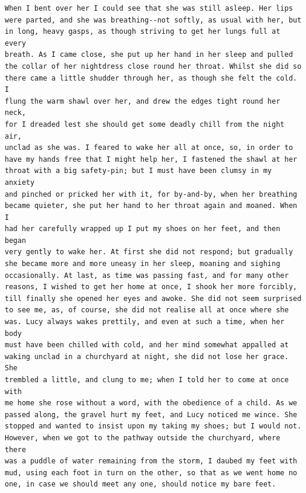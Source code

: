 \documentclass{article}
\begin{document}
\begin{verbatim}
When I bent over her I could see that she was still asleep. Her lips
were parted, and she was breathing--not softly, as usual with her, but
in long, heavy gasps, as though striving to get her lungs full at every
breath. As I came close, she put up her hand in her sleep and pulled
the collar of her nightdress close round her throat. Whilst she did so
there came a little shudder through her, as though she felt the cold. I
flung the warm shawl over her, and drew the edges tight round her neck,
for I dreaded lest she should get some deadly chill from the night air,
unclad as she was. I feared to wake her all at once, so, in order to
have my hands free that I might help her, I fastened the shawl at her
throat with a big safety-pin; but I must have been clumsy in my anxiety
and pinched or pricked her with it, for by-and-by, when her breathing
became quieter, she put her hand to her throat again and moaned. When I
had her carefully wrapped up I put my shoes on her feet, and then began
very gently to wake her. At first she did not respond; but gradually
she became more and more uneasy in her sleep, moaning and sighing
occasionally. At last, as time was passing fast, and for many other
reasons, I wished to get her home at once, I shook her more forcibly,
till finally she opened her eyes and awoke. She did not seem surprised
to see me, as, of course, she did not realise all at once where she
was. Lucy always wakes prettily, and even at such a time, when her body
must have been chilled with cold, and her mind somewhat appalled at
waking unclad in a churchyard at night, she did not lose her grace. She
trembled a little, and clung to me; when I told her to come at once with
me home she rose without a word, with the obedience of a child. As we
passed along, the gravel hurt my feet, and Lucy noticed me wince. She
stopped and wanted to insist upon my taking my shoes; but I would not.
However, when we got to the pathway outside the churchyard, where there
was a puddle of water remaining from the storm, I daubed my feet with
mud, using each foot in turn on the other, so that as we went home no
one, in case we should meet any one, should notice my bare feet.


\end{verbatim}
\end{document}
